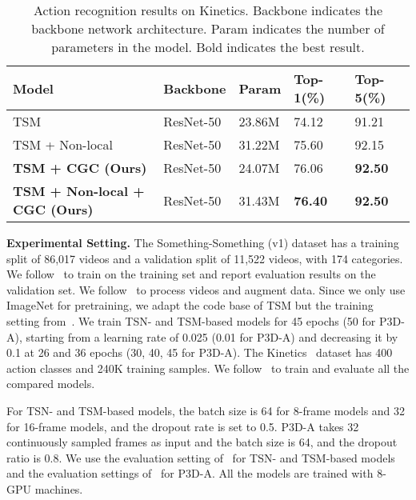 \documentclass[runningheads]{llncs}
\begin{document}
\begin{table*}[t]
\caption{Action recognition results on Kinetics. Backbone indicates the backbone network architecture. Param indicates the number of parameters in the model. Bold indicates the best result.}
\label{tab:kin}
\begin{center}
\tiny
\begin{tabular}{lllll}
\hline

Model  & Backbone & Param   & Top-1(\%) & Top-5(\%) 
\\ \hline 


TSM~\cite{lin2018temporal} & ResNet-50         & 23.86M  & 74.12 & 91.21 \\ 
TSM + Non-local~\cite{wang2017non} & ResNet-50         & 31.22M  & 75.60 & 92.15 \\ 
\textbf{TSM + CGC (Ours)} & ResNet-50         & 24.07M  & 76.06 &  \textbf{92.50} \\
\textbf{TSM + Non-local + CGC (Ours)} & ResNet-50         & 31.43M & \textbf{76.40} &  \textbf{92.50} \\
\hline

\end{tabular}
\end{center}

\end{table*}

\textbf{Experimental Setting.} 
The Something-Something (v1) dataset has a training split of 86,017 videos and a validation split of 
11,522 videos, with 174 categories. We follow~\cite{qiao2019weight} to train on the training set and report evaluation results on the validation set. We follow~\cite{lin2018temporal} to process videos and augment data. Since we only use ImageNet for pretraining, we adapt the code base of TSM but the training setting from~\cite{qiao2019weight}. We train TSN- and TSM-based models for 45 epochs (50 for P3D-A), starting from a learning rate of 0.025 (0.01 for P3D-A) and decreasing it by 0.1 at 26 and 36 epochs (30, 40, 45 for P3D-A). The Kinetics~\cite{Kinetics} dataset has 400 action classes and 240K training samples. We follow~\cite{lin2018temporal} to train and evaluate all the compared models.

For TSN- and TSM-based models, the batch size is 64 for 8-frame models and 32 for 16-frame models, and the dropout rate is set to 0.5. P3D-A takes 32 continuously sampled frames as input and the batch size is 64, and the dropout ratio is 0.8. We use the evaluation setting of~\cite{lin2018temporal} for TSN- and TSM-based models and the evaluation settings of~\cite{wang2017non} for P3D-A. All the models are trained with 8-GPU machines.
\end{document}
